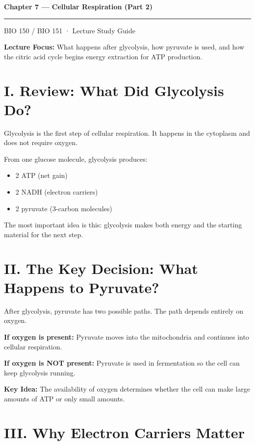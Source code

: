 \documentclass[9pt]{article}
\newcommand{\StudyTitle}[1]{%
{\LARGE\bfseries\color{DeepBlue} #1}\par\vspace{0.4em}\hrule\vspace{1em}
}
\begin{document}
\StudyTitle{Chapter 7 — Cellular Respiration (Part 2)}
BIO 150 / BIO 151 · Lecture Study Guide

\noindent\textbf{Lecture Focus:}  
What happens after glycolysis, how pyruvate is used, and how the citric acid cycle begins energy extraction for ATP production.


\section*{I. Review: What Did Glycolysis Do?}

Glycolysis is the first step of cellular respiration. It happens in the cytoplasm and does not require oxygen.

From one glucose molecule, glycolysis produces:
\begin{itemize}
\item 2 ATP (net gain)
\item 2 NADH (electron carriers)
\item 2 pyruvate (3-carbon molecules)
\end{itemize}

The most important idea is this: glycolysis makes both energy and the starting material for the next step.


\section*{II. The Key Decision: What Happens to Pyruvate?}

After glycolysis, pyruvate has two possible paths. The path depends entirely on oxygen.

\textbf{If oxygen is present:}
Pyruvate moves into the mitochondria and continues into cellular respiration.

\textbf{If oxygen is NOT present:}
Pyruvate is used in fermentation so the cell can keep glycolysis running.

\medskip
\textbf{Key Idea:}  
The availability of oxygen determines whether the cell can make large amounts of ATP or only small amounts.


\section*{III. Why Electron Carriers Matter}
\end{document}

